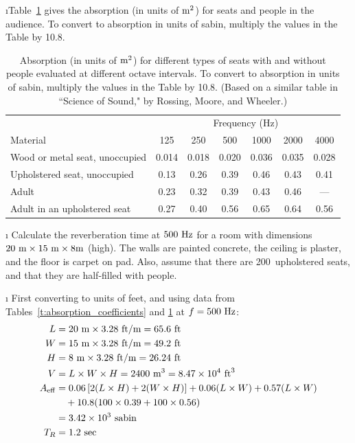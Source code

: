 \i Table~\ref{t:absorption_audience} gives the
absorption (in units of ${\rm m}^2$) for seats and
people in the audience.
To convert to absorption in units of sabin,
multiply the values in the Table by 10.8.
%
\begin{table}[htbp]
\begin{center}
\begin{tabular}{l c c c c c c}
\hline
& \multicolumn{6}{c}{Frequency (Hz)} \\
Material & 125 & 250 & 500 & 1000 & 2000 & 4000 \\
\hline
Wood or metal seat, unoccupied &
0.014 & 0.018 & 0.020 & 0.036 & 0.035 & 0.028 \\
Upholstered seat, unoccupied &
0.13 & 0.26 & 0.39 & 0.46 & 0.43 & 0.41 \\
Adult &
0.23 & 0.32 & 0.39 & 0.43 & 0.46 & --- \\
Adult in an upholstered seat &
0.27 & 0.40 & 0.56 & 0.65 & 0.64 & 0.56 \\
\hline
\end{tabular}
\caption{Absorption (in units of ${\rm m}^2$) 
for different types of seats with and without people 
evaluated at different octave intervals.
To convert to absorption in units of sabin, 
multiply the values in the Table by 10.8.
(Based on a similar table in
``Science of Sound," by Rossing, Moore, and Wheeler.)}
\label{t:absorption_audience}
\end{center}
\end{table}

\i \exer
Calculate the reverberation time at $500~{\rm Hz}$ for a room
with dimensions $20~{\rm m}\times 15~{\rm m}\times 8{\rm m}$ (high).
The walls are painted concrete, the ceiling is plaster,
and the floor is carpet on pad.
Also, assume that there are 200~upholstered seats, and that
they are half-filled with people.

\i \ans
First converting to units of feet, and 
using data from Tables~\ref{t:absorption_coefficients} and 
\ref{t:absorption_audience} at $f=500~{\rm Hz}$:
%
\begin{align}
L&= 20~{\rm m}\times 3.28~{\rm ft/m} = 65.6~{\rm ft}
\\
W&=15~{\rm m}\times 3.28~{\rm ft/m} = 49.2~{\rm ft}
\\
H&=8~{\rm m}\times 3.28~{\rm ft/m} = 26.24~{\rm ft}
\\
V&=L\times W\times H =2400~{\rm m}^3
=8.47\times 10^4~{\rm ft}^3
\\
A_{\rm eff}&= 
0.06\left[2(L\times H) + 2(W\times H)\right]
+0.06 (L\times W) + 0.57 (L\times W)
\nonumber\\
&\quad + 10.8(100\times 0.39 + 100\times 0.56)
\nonumber\\
&= 3.42\times 10^3~{\rm sabin}
\\
T_R &= 1.2~{\rm sec}
\end{align}


